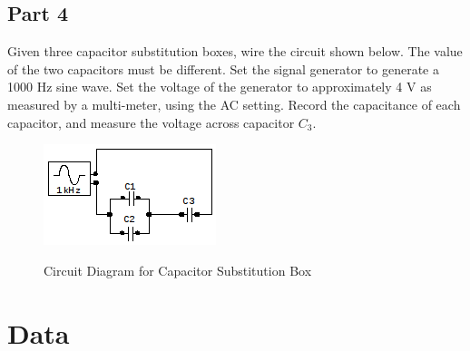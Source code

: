 \documentclass[twocolumn,english]{IEEEtran}
\theoremstyle{plain}
\theoremstyle{plain}
\begin{document}
\subsection*{Part 4}
Given three capacitor substitution boxes, wire the circuit shown below. The value of the two capacitors must be different. Set the signal generator to generate a 1000 Hz sine wave. Set the voltage of the generator to approximately 4 V as measured by a multi-meter, using the AC setting. Record the capacitance of each capacitor, and measure the voltage across capacitor $C_3$.

\begin{figure}[h!]
\begin{centering}
  \begin{center}
\includegraphics[keepaspectratio=true]{./Pictures/diagram1.png}
\label{fig:circuit_diagram1}
\caption{Circuit Diagram for Capacitor Substitution Box}
\end{center}
\par\end{centering}
\end{figure}



\section{Data}
\end{document}

